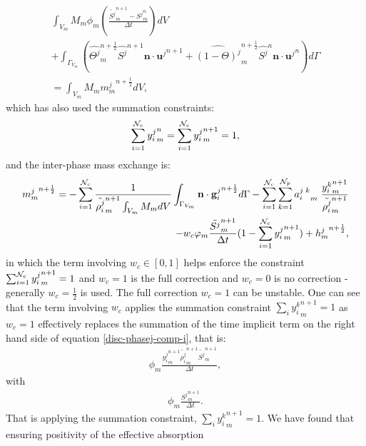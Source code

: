 \begin{eqnarray}
\int_{V_m} M_m \phi_m \left( \frac{ 
\tilde{ S^{j}}_m^{n+1} -
 {S^{j}}_m^n } 
{\Delta t} \right) dV \\
+
\int_{\Gamma_{V_m}} \left( 
\widehat{{\Theta}^j}_m^{n+\frac{1}{2}}
 \hat{S^{j}}^{n+1} \mathbf{n}\cdot {\mathbf{u}^{j}}^{n+1}
+   
\widehat{{(1-\Theta)}^j}_m^{n+\frac{1}{2}} 
 \hat{S^{j}}^n \mathbf{n}\cdot {\mathbf{u}^{j}}^{n}
 \right)  d\Gamma \\
= \int_{V_m} M_m {m^j_m}^{n+\frac{1}{2}} dV , 
\label{disc-phasej-sat-i}
\end{eqnarray}
which has also used the summation constraints:  
\begin{eqnarray}
\sum_{i=1}^{{\cal N}_c} {y_{i}^{j}}_m^n=\sum_{i=1}^{{\cal N}_c} {y_{i}^{j}}_m^{n+1}=1, 
\label{sum-constraint} 
\end{eqnarray}
and the inter-phase mass exchange is:
\begin{eqnarray}
{m^j_m}^{n+\frac{1}{2}}= -\sum_{i=1}^{{\cal N}_c} 
\frac{1}{ \tilde{\rho_{i}^{j}}_m^{n+1}\int_{V_m}M_m dV}  
\int_{\Gamma_{V_m}}  \mathbf{n}\cdot{\mathbf{g}_i^{j}}^{n+\frac{1}{2}}d\Gamma
-\sum_{i=1}^{{\cal N}_c} \sum_{k=1}^{{\cal N}_p}{a_i^{j\;k}}_m \; 
\frac{ {y_i^k}_m^{n+1} }{  \tilde{\rho_{i}^{j}}_m^{n+1}  } 
\\
-w_c \phi_m\frac{\tilde{ S^j}_m^{n+1}}{\Delta t} ( 
1- \sum_{i=1}^{{\cal N}_c} { y_{i}^{j}}_m^{n+1}   ) 
+ {h^j_m}^{n+\frac{1}{2}}
, 
\label{disc-mass-exchange}
\end{eqnarray}
in which the term involving $w_c\in [0, 1 ]$ helps enforce the constraint 
$\sum_{i=1}^{{\cal N}_c} {y_{i}^{j}}_m^{n+1}=1$ and $w_c=1$ is the full correction 
and $w_c=0$ is no correction - generally $w_c=\frac{1}{2}$ is used. The full correction 
$w_c=1$ can be unstable. One can see that the term involving $w_c$ applies the summation
constraint $\sum_i {y_i^k}_m^{n+1}=1$ as $w_c=1$ effectively replaces the summation 
of the time implicit term on 
the right hand side of equation \ref{disc-phasej-comp-i}, that is:
\begin{eqnarray}
\phi_m  \frac{ {y_{i}^{j}}_m^{n+1}
\tilde{\rho_i^{j}}_m^{n+1} \tilde{S^{j}}_m^{n+1}  } 
{\Delta t} ,
\end{eqnarray}
with
\begin{eqnarray}
\phi_m \frac{{ S^j}_m^{n+1}}{\Delta t}. 
\end{eqnarray}
That is applying the summation constraint, $\sum_i {y_i^k}_m^{n+1}=1$. 
We have found that ensuring positivity of the effective absorption 
